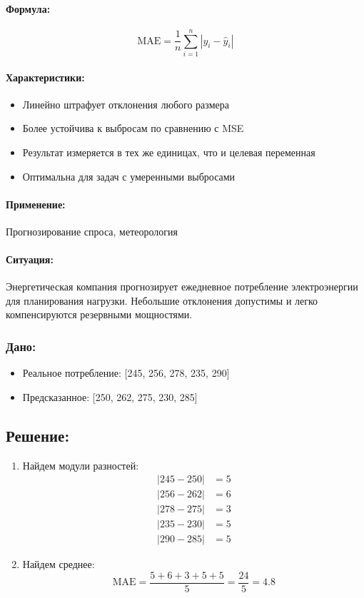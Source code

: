 \documentclass[12pt]{article}
\theoremstyle{definition}
\theoremstyle{definition}
\theoremstyle{definition}
\theoremstyle{remark}
\theoremstyle{remark}
\begin{document}
\paragraph{Формула:}
\begin{equation}
    \text{MAE} = \frac{1}{n} \sum_{i=1}^{n} |y_i - \hat{y}_i|
\end{equation}

\paragraph{Характеристики:}
\begin{itemize}
    \item Линейно штрафует отклонения любого размера
    \item Более устойчива к выбросам по сравнению с MSE
    \item Результат измеряется в тех же единицах, что и целевая переменная
    \item Оптимальна для задач с умеренными выбросами
\end{itemize}

\paragraph{Применение:} Прогнозирование спроса, метеорология

\paragraph{Ситуация:} Энергетическая компания прогнозирует ежедневное потребление электроэнергии для планирования нагрузки. Небольшие отклонения допустимы и легко компенсируются резервными мощностями.

\subsubsection*{Дано:}
\begin{itemize}
    \item Реальное потребление: [245, 256, 278, 235, 290]
    \item Предсказанное: [250, 262, 275, 230, 285]
\end{itemize}

\subsection*{Решение:}

\begin{enumerate}
    \item {Найдем модули разностей:}
    \[
    \begin{aligned}
    |245 - 250| &= 5 \\
    |256 - 262| &= 6 \\
    |278 - 275| &= 3 \\
    |235 - 230| &= 5 \\
    |290 - 285| &= 5
    \end{aligned}
    \]

    \item {Найдем среднее:}
    \[
    \text{MAE} = \frac{5 + 6 + 3 + 5 + 5}{5} = \frac{24}{5} = 4.8
    \]
\end{enumerate}
\end{document}
